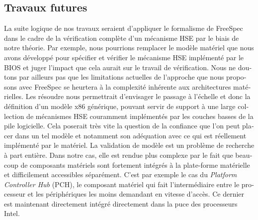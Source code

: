 \begin{otherlanguage}{french}
  \subsection*{Travaux futures}
  La suite logique de nos travaux seraient d’appliquer le formalisme de FreeSpec
  dans le cadre de la vérification complète d’un mécanisme HSE par le biais de
  notre théorie.
  Par exemple, nous pourrions remplacer le modèle matériel que nous avons
  développé pour spécifier et vérifier le mécanisme HSE implémenté par le BIOS
  et juger l’impact que cela aurait sur le travail de vérification.
  Nous ne doutons par ailleurs pas que les limitations actuelles de l’approche
  que nous proposons avec FreeSpec se heurtera à la
  complexité inhérente aux architectures matérielles.
  Les résoudre nous permettrait d’envisager le passage à l’échelle et donc la
  définition d’un modèle x86 générique, pouvant servir de support à une large
  collection de mécanismes HSE couramment implémentés par les couches basses de
  la pile logicielle.
  Cela poserait très vite la question de la confiance que l’on peut placer dans
  un tel modèle et notamment son adéquation avec ce qui est réellement
  implémenté par le matériel.
  La validation de modèle est un problème de recherche à part entière.
  Dans notre cas, elle est rendue plus complexe par le fait que beaucoup de
  composants matériels sont fortement intégrés à la plate-forme matérielle et
  difficilement accessibles séparément.
  C'est par exemple le cas du \emph{Platform Controller Hub} (PCH), le composant
  matériel qui fait l’intermédiaire entre le processeur et les périphériques les
  moins demandant en vitesse d’accès.
  Ce dernier est maintenant directement intégré directement dans la puce des
  processeurs Intel.
\end{otherlanguage}
